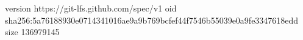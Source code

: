 version https://git-lfs.github.com/spec/v1
oid sha256:5a76188930e0714341016ae9a9b769bcfef44f7546b55039e0a9fe3347618edd
size 136979145

